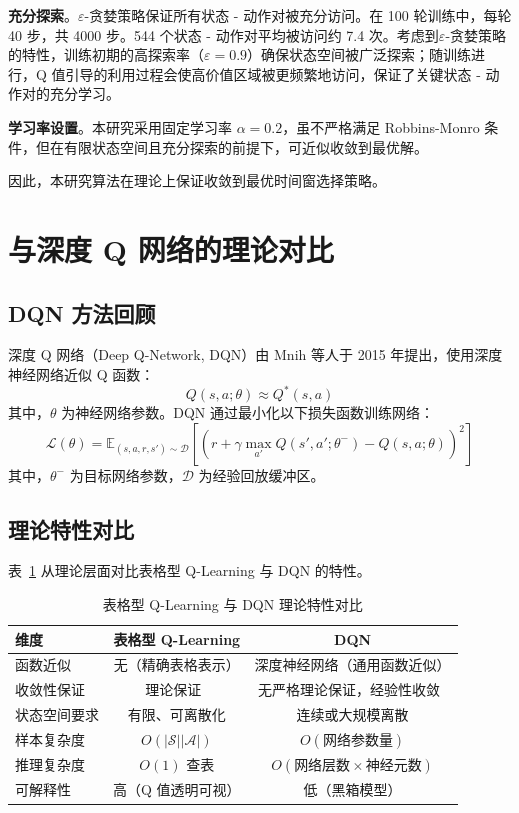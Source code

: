 \textbf{充分探索}。$\varepsilon$-贪婪策略保证所有状态 - 动作对被充分访问。在 100 轮训练中，每轮 40 步，共 4000 步。544 个状态 - 动作对平均被访问约 7.4 次。考虑到$\varepsilon$-贪婪策略的特性，训练初期的高探索率（$\varepsilon = 0.9$）确保状态空间被广泛探索；随训练进行，Q 值引导的利用过程会使高价值区域被更频繁地访问，保证了关键状态 - 动作对的充分学习。

\textbf{学习率设置}。本研究采用固定学习率 $\alpha = 0.2$，虽不严格满足 Robbins-Monro 条件，但在有限状态空间且充分探索的前提下，可近似收敛到最优解。

因此，本研究算法在理论上保证收敛到最优时间窗选择策略。

\section{与深度 Q 网络的理论对比}
\label{sec:comparison}

\subsection{DQN 方法回顾}
\label{subsec:dqn_review}

深度 Q 网络（Deep Q-Network, DQN）由 Mnih 等人于 2015 年提出\cite{mnih2015human}，使用深度神经网络近似 Q 函数：
\begin{equation}
Q(s, a; \theta) \approx Q^*(s, a)
\end{equation}
其中，$\theta$ 为神经网络参数。DQN 通过最小化以下损失函数训练网络：
\begin{equation}
\mathcal{L}(\theta) = \mathbb{E}_{(s,a,r,s') \sim \mathcal{D}} \left[ \left( r + \gamma \max_{a'} Q(s', a'; \theta^-) - Q(s, a; \theta) \right)^2 \right]
\end{equation}
其中，$\theta^-$ 为目标网络参数，$\mathcal{D}$ 为经验回放缓冲区。

\subsection{理论特性对比}
\label{subsec:theoretical_comparison}

表~\ref{tab:comparison} 从理论层面对比表格型 Q-Learning 与 DQN 的特性。

\begin{table}[H]
\centering
\caption{表格型 Q-Learning 与 DQN 理论特性对比}
\label{tab:comparison}
\begin{tabular}{lcc}
\hline
\textbf{维度} & \textbf{表格型 Q-Learning} & \textbf{DQN} \\
\hline
函数近似 & 无（精确表格表示） & 深度神经网络（通用函数近似） \\
收敛性保证 & 理论保证~\cite{watkins1992q} & 无严格理论保证，经验性收敛~\cite{mnih2015human} \\
状态空间要求 & 有限、可离散化 & 连续或大规模离散 \\
样本复杂度 & $O(|\mathcal{S}||\mathcal{A}|)$ & $O(\text{网络参数量})$ \\
推理复杂度 & $O(1)$ 查表 & $O(\text{网络层数} \times \text{神经元数})$ \\
可解释性 & 高（Q 值透明可视） & 低（黑箱模型） \\
\hline
\end{tabular}
\end{table}

